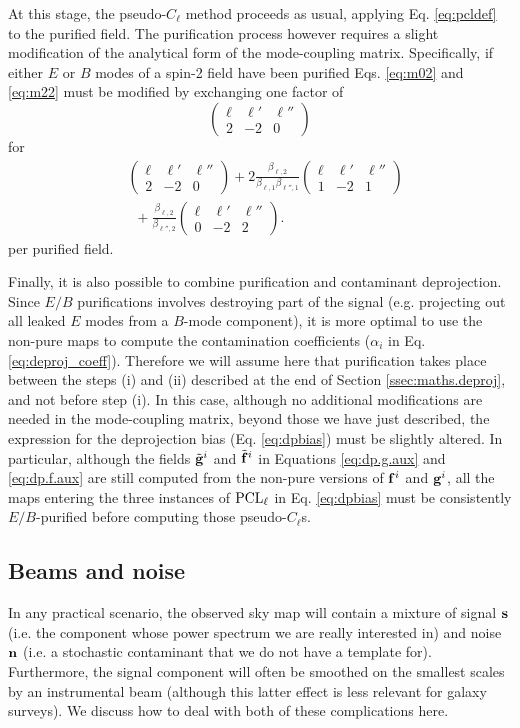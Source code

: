 \documentclass[usenatbib]{mnrasb}
\newcommand{\wtj}[6]{\left(\begin{array}{ccc} #1 & #2 & #3\\#4 & #5 & #6\end{array} \right)}
\begin{document}
      At this stage, the pseudo-$C_\ell$ method proceeds as usual, applying Eq. \ref{eq:pcldef} to the purified field. The purification process however requires a slight modification of the analytical form of the mode-coupling matrix. Specifically, if either $E$ or $B$ modes of a spin-2 field have been purified Eqs. \ref{eq:m02} and \ref{eq:m22} must be modified by exchanging one factor of
      \begin{equation}\nonumber
        \wtj{\ell}{\ell'}{\ell''}{2}{-2}{0}
      \end{equation}
      for
      \begin{align}\nonumber
        &\wtj{\ell}{\ell'}{\ell''}{2}{-2}{0}+2\frac{\beta_{\ell,2}}{\beta_{\ell,1}\beta_{\ell'',1}}\wtj{\ell}{\ell'}{\ell''}{1}{-2}{1}\\
        &\,\,\,+\frac{\beta_{\ell,2}}{\beta_{\ell'',2}}\wtj{\ell}{\ell'}{\ell''}{0}{-2}{2}.
      \end{align}
      per purified field.
      
      Finally, it is also possible to combine purification and contaminant deprojection. Since $E/B$ purifications involves destroying part of the signal (e.g. projecting out all leaked $E$ modes from a $B$-mode component), it is more optimal to use the non-pure maps to compute the contamination coefficients ($\alpha_i$ in Eq. \ref{eq:deproj_coeff}). Therefore we will assume here that purification takes place between the steps (i) and (ii) described at the end of Section \ref{ssec:maths.deproj}, and not before step (i). In this case, although no additional modifications are needed in the mode-coupling matrix, beyond those we have just described, the expression for the deprojection bias (Eq. \ref{eq:dpbias}) must be slightly altered. In particular, although the fields $\tilde{\bf g}^i$ and $\tilde{\bf f}^i$ in Equations \ref{eq:dp.g.aux} and \ref{eq:dp.f.aux} are still computed from the non-pure versions of ${\bf f}^i$ and ${\bf g}^i$, all the maps entering the three instances of ${\rm PCL}_\ell$ in Eq. \ref{eq:dpbias} must be consistently $E/B$-purified before computing those pseudo-$C_\ell$s.
        
      \subsection{Beams and noise}\label{ssec:maths.beam_noise}
        In any practical scenario, the observed sky map will contain a mixture of signal ${\bf s}$ (i.e. the component whose power spectrum we are really interested in) and noise ${\bf n}$ (i.e. a stochastic contaminant that we do not have a template for). Furthermore, the signal component will often be smoothed on the smallest scales by an instrumental beam (although this latter effect is less relevant for galaxy surveys). We discuss how to deal with both of these complications here.
        
\end{document}
